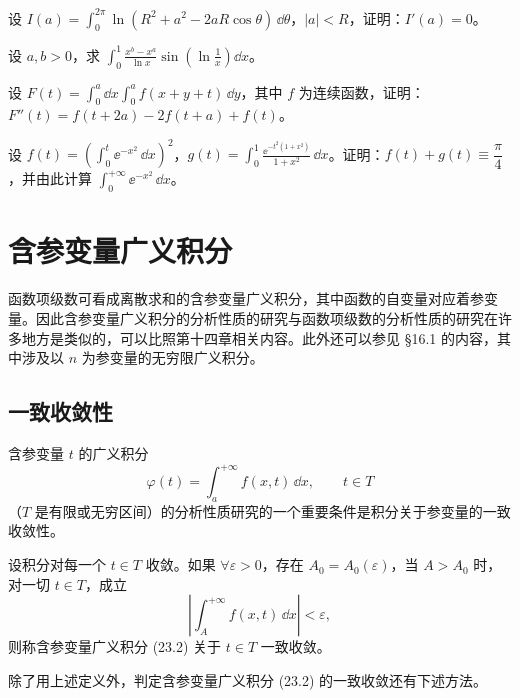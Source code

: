 \begin{xexercise}[4]
设 $I(a)=\displaystyle\int_0^{2\pi}\ln(R^2+a^2-2aR\cos\theta)\,\dd\theta$，$|a|<R$，证明：$I'(a)=0$。
\end{xexercise}

\begin{xexercise}[5]
设 $a,b>0$，求 $\displaystyle\int_0^1\frac{x^b-x^a}{\ln x}\sin\left(\ln\frac1x\right)\dd x$。
\end{xexercise}

\begin{xexercise}[6]
设 $F(t)=\displaystyle\int_0^a\dd x\int_0^a f(x+y+t)\,\dd y$，其中 $f$ 为连续函数，证明：$F''(t)=f(t+2a)-2f(t+a)+f(t)$。
\end{xexercise}

\begin{xexercise}[7]
设 $f(t)=\left(\displaystyle\int_0^t\ee^{-x^2}\,\dd x\right)^2$，$g(t)=\displaystyle\int_0^1\frac{\ee^{-t^2(1+x^2)}}{1+x^2}\,\dd x$。证明：$f(t)+g(t)\equiv\dfrac\pi4$，并由此计算 $\displaystyle\int_0^{+\infty}\ee^{-x^2}\,\dd x$。
\end{xexercise}

\section{含参变量广义积分}

函数项级数可看成离散求和的含参变量广义积分，其中函数的自变量对应着参变量。因此含参变量广义积分的分析性质的研究与函数项级数的分析性质的研究在许多地方是类似的，可以比照第十四章相关内容。此外还可以参见 §16.1 的内容，其中涉及以 $n$ 为参变量的无穷限广义积分。

\subsection{一致收敛性}

含参变量 $t$ 的广义积分
\begin{equation}
  \varphi(t)=\int_a^{+\infty}f(x,t)\,\dd x,\qquad t\in T
  \tag{23.2}
  \label{eq:23.2}
\end{equation}
（$T$ 是有限或无穷区间）的分析性质研究的一个重要条件是积分关于参变量的一致收敛性。

设积分对每一个 $t\in T$ 收敛。如果 $\forall\varepsilon>0$，存在 $A_0=A_0(\varepsilon)$，当 $A>A_0$ 时，对一切 $t\in T$，成立
\[
  \left|\int_A^{+\infty}f(x,t)\,\dd x\right|<\varepsilon,
\]
则称含参变量广义积分 (23.2) 关于 $t\in T$ 一致收敛。

除了用上述定义外，判定含参变量广义积分 (23.2) 的一致收敛还有下述方法。

